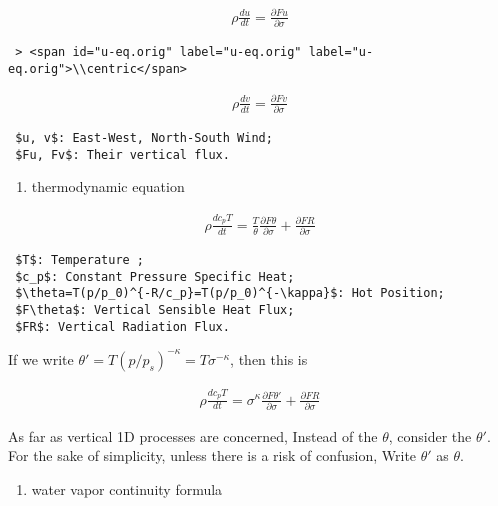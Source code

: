 \begin{eqnarray}
  \rho \frac{du}{dt} = \frac{\partial Fu}{\partial \sigma}
\end{eqnarray}

\begin{verbatim}
 > <span id="u-eq.orig" label="u-eq.orig" label="u-eq.orig">\\centric</span>
\end{verbatim}

\begin{eqnarray}
  \rho \frac{dv}{dt} = \frac{\partial Fv}{\partial \sigma}
\end{eqnarray}

\begin{verbatim}
 $u, v$: East-West, North-South Wind;
 $Fu, Fv$: Their vertical flux.
\end{verbatim}

\begin{enumerate}
\def\labelenumi{\arabic{enumi}.}
\setcounter{enumi}{1}
\tightlist
\item
  thermodynamic equation
\end{enumerate}

\begin{eqnarray}
  \rho \frac{dc_p T}{dt} = \frac{T}{\theta} \frac{\partial F{\theta}}{\partial \sigma} 
                     + \frac{\partial F{R}}{\partial \sigma} 
\end{eqnarray}

\begin{verbatim}
 $T$: Temperature ;
 $c_p$: Constant Pressure Specific Heat;
 $\theta=T(p/p_0)^{-R/c_p}=T(p/p_0)^{-\kappa}$: Hot Position;
 $F\theta$: Vertical Sensible Heat Flux;
 $FR$: Vertical Radiation Flux.
\end{verbatim}

If we write \(\theta'=T(p/p_s)^{-\kappa}=T\sigma^{-\kappa}\), then this
is

\begin{eqnarray}
  \rho \frac{dc_p T}{dt} = \sigma^\kappa \frac{\partial F{\theta'}}{\partial \sigma} 
                     + \frac{\partial F{R}}{\partial \sigma} 
\end{eqnarray}

As far as vertical 1D processes are concerned, Instead of the
\(\theta\), consider the \(\theta'\). For the sake of simplicity, unless
there is a risk of confusion, Write \(\theta'\) as \(\theta\).

\begin{enumerate}
\def\labelenumi{\arabic{enumi}.}
\setcounter{enumi}{2}
\tightlist
\item
  water vapor continuity formula
\end{enumerate}

